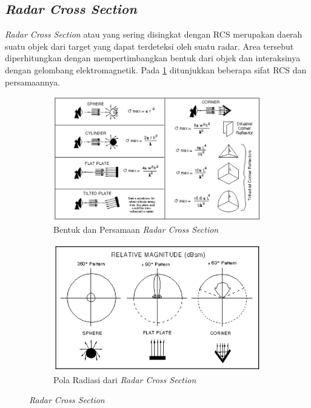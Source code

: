 \subsection{\textit{Radar Cross Section}}
\textit{Radar Cross Section} atau yang sering disingkat dengan RCS merupakan daerah suatu objek dari target yang dapat terdeteksi oleh suatu radar. Area tersebut diperhitungkan dengan mempertimbangkan bentuk dari objek dan interaksinya dengan gelombang elektromagnetik. Pada \ref{pic:RCS} ditunjukkan beberapa sifat RCS dan persamaannya.
\begin{center}
	\begin{figure}[h!]
		\begin{subfigure}[b]{0.5\linewidth}
			\includegraphics[width=\linewidth]{pics/bab2/rcsBentuk.png}
			\caption{Bentuk dan Persamaan \textit{Radar Cross Section}}
			\end{subfigure}
			\begin{subfigure}[b]{0.5\linewidth}
				\includegraphics[width=\linewidth]{pics/bab2/rcsPola.png}
				\caption{Pola Radiasi dari \textit{Radar Cross Section}}
				\end{subfigure}
		\caption[\textit{Radar Cross Section}]{\textit{Radar Cross Section} \cite{ONeill2012}}
		\label{pic:RCS}
		\end{figure}
\end{center}

